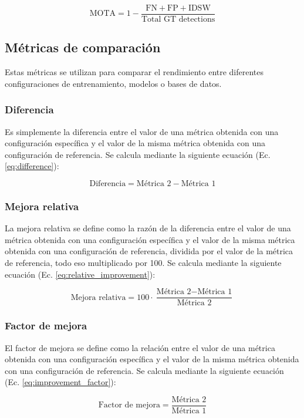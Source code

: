 \begin{equation}
\text{MOTA} = 1 - \dfrac{\text{FN} + \text{FP} + \text{IDSW}}{\text{Total GT detections}}
\label{eq:mota}
\end{equation}


\subsection{Métricas de comparación}
Estas métricas se utilizan para comparar el rendimiento entre diferentes configuraciones de entrenamiento, modelos o bases de datos.

\subsubsection{Diferencia}
Es simplemente la diferencia entre el valor de una métrica obtenida con una configuración específica y el valor de la misma métrica obtenida con una configuración de referencia. Se calcula mediante la siguiente ecuación (Ec. \ref{eq:difference}):

\begin{equation}
  \text{Diferencia} = \text{Métrica 2} - \text{Métrica 1}
  \label{eq:difference}
\end{equation}

\subsubsection{Mejora relativa}
La mejora relativa se define como la razón de la diferencia entre el valor de una métrica obtenida con una configuración específica y el valor de la misma métrica obtenida con una configuración de referencia, dividida por el valor de la métrica de referencia, todo eso multiplicado por 100. Se calcula mediante la siguiente ecuación (Ec. \ref{eq:relative_improvement}):

\begin{equation}
  \text{Mejora relativa} = 100 \cdot \dfrac{\text{Métrica 2} - \text{Métrica 1}}{\text{Métrica 2}}
  \label{eq:relative_improvement}
\end{equation}

\subsubsection{Factor de mejora}
El factor de mejora se define como la relación entre el valor de una métrica obtenida con una configuración específica y el valor de la misma métrica obtenida con una configuración de referencia. Se calcula mediante la siguiente ecuación (Ec. \ref{eq:improvement_factor}):

\begin{equation}
  \text{Factor de mejora} = \dfrac{\text{Métrica 2}}{\text{Métrica 1}}
  \label{eq:improvement_factor}
\end{equation}